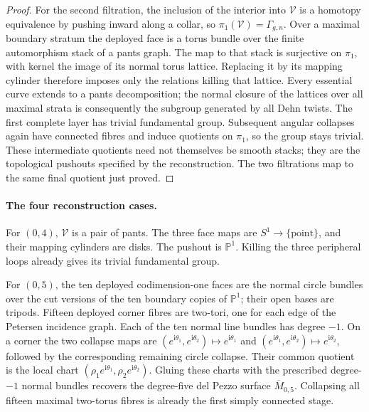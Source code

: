 \begin{proof}
For the second filtration, the inclusion of the interior into $\mathcal V$ is a homotopy equivalence by pushing inward along a collar, so $\pi_1(\mathcal V)=\Gamma_{g,n}$. Over a maximal boundary stratum the deployed face is a torus bundle over the finite automorphism stack of a pants graph. The map to that stack is surjective on $\pi_1$, with kernel the image of its normal torus lattice. Replacing it by its mapping cylinder therefore imposes only the relations killing that lattice. Every essential curve extends to a pants decomposition; the normal closure of the lattices over all maximal strata is consequently the subgroup generated by all Dehn twists. The first complete layer has trivial fundamental group. Subsequent angular collapses again have connected fibres and induce quotients on $\pi_1$, so the group stays trivial. These intermediate quotients need not themselves be smooth stacks; they are the topological pushouts specified by the reconstruction. The two filtrations map to the same final quotient just proved.
\end{proof}

\paragraph{The four reconstruction cases.}
For $(0,4)$, $\mathcal V$ is a pair of pants. The three face maps are $S^1\to\{\text{point}\}$, and their mapping cylinders are disks. The pushout is $\mathbb P^1$. Killing the three peripheral loops already gives its trivial fundamental group.

For $(0,5)$, the ten deployed codimension-one faces are the normal circle bundles over the cut versions of the ten boundary copies of $\mathbb P^1$; their open bases are tripods. Fifteen deployed corner fibres are two-tori, one for each edge of the Petersen incidence graph. Each of the ten normal line bundles has degree $-1$. On a corner the two collapse maps are $(e^{\mathrm i\theta_1},e^{\mathrm i\theta_2})\mapsto e^{\mathrm i\theta_1}$ and $(e^{\mathrm i\theta_1},e^{\mathrm i\theta_2})\mapsto e^{\mathrm i\theta_2}$, followed by the corresponding remaining circle collapse. Their common quotient is the local chart $(\rho_1e^{\mathrm i\theta_1},\rho_2e^{\mathrm i\theta_2})$. Gluing these charts with the prescribed degree-$-1$ normal bundles recovers the degree-five del Pezzo surface $\overline M_{0,5}$. Collapsing all fifteen maximal two-torus fibres is already the first simply connected stage.

